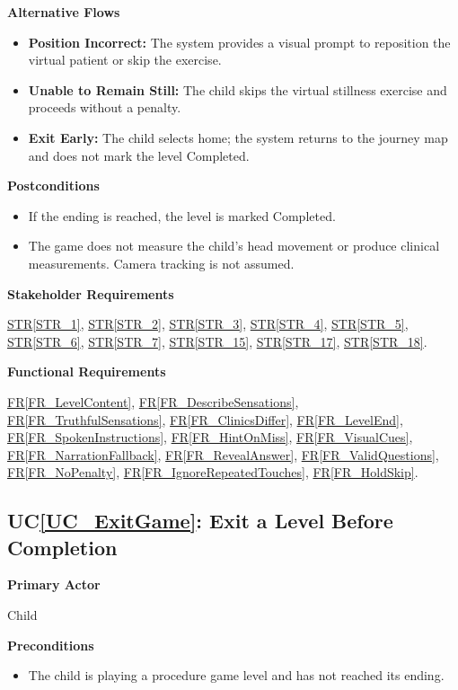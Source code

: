 \documentclass[10pt]{article}
\newcommand{\strref}[1]{\hyperref[#1]{STR\ref*{#1}}}
\newcounter{ucnum} %
\newcommand{\ucheading}[1]{UC\ref*{#1}}
\newcommand{\rref}[1]{\hyperref[#1]{FR\ref*{#1}}}
\begin{document}
\textbf{Alternative Flows}
\begin{itemize}
    \item \textbf{Position Incorrect:} The system provides a visual
    prompt to reposition the virtual patient or skip the exercise.
    \item \textbf{Unable to Remain Still:} The child skips the
    virtual stillness exercise and proceeds without a penalty.
    \item \textbf{Exit Early:} The child selects home; the system
    returns to the journey map and does not mark the level Completed.
\end{itemize}

\textbf{Postconditions}
\begin{itemize}
    \item If the ending is reached, the level is marked Completed.
    \item The game does not measure the child's head movement or
    produce clinical measurements. Camera tracking is not assumed.
\end{itemize}

\textbf{Stakeholder Requirements}

\strref{STR_1}, \strref{STR_2}, \strref{STR_3}, \strref{STR_4}, \strref{STR_5}, \strref{STR_6}, \strref{STR_7}, \strref{STR_15}, \strref{STR_17}, \strref{STR_18}.

\textbf{Functional Requirements}

\rref{FR_LevelContent}, \rref{FR_DescribeSensations}, \rref{FR_TruthfulSensations}, \rref{FR_ClinicsDiffer}, \rref{FR_LevelEnd}, \rref{FR_SpokenInstructions}, \rref{FR_HintOnMiss}, \rref{FR_VisualCues}, \rref{FR_NarrationFallback}, \rref{FR_RevealAnswer}, \rref{FR_ValidQuestions}, \rref{FR_NoPenalty}, \rref{FR_IgnoreRepeatedTouches}, \rref{FR_HoldSkip}.

\label{UC_ExitGame}
\subsection{\ucheading{UC_ExitGame}: Exit a Level Before Completion}

\textbf{Primary Actor}

Child

\textbf{Preconditions}
\begin{itemize}
    \item The child is playing a procedure game level and has not
    reached its ending.
\end{itemize}
\end{document}
